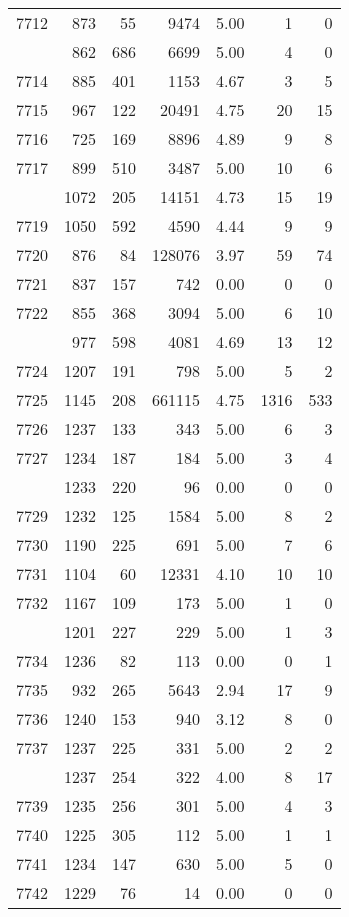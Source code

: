 \documentclass[
]{article}
\begin{document}
\begin{table}
\begin{tabular}[t]{lrrrrrr}
7712 & 873 & 55 & 9474 & 5.00 & 1 & 0\\
\addlinespace
7713 & 862 & 686 & 6699 & 5.00 & 4 & 0\\
7714 & 885 & 401 & 1153 & 4.67 & 3 & 5\\
7715 & 967 & 122 & 20491 & 4.75 & 20 & 15\\
7716 & 725 & 169 & 8896 & 4.89 & 9 & 8\\
7717 & 899 & 510 & 3487 & 5.00 & 10 & 6\\
\addlinespace
7718 & 1072 & 205 & 14151 & 4.73 & 15 & 19\\
7719 & 1050 & 592 & 4590 & 4.44 & 9 & 9\\
7720 & 876 & 84 & 128076 & 3.97 & 59 & 74\\
7721 & 837 & 157 & 742 & 0.00 & 0 & 0\\
7722 & 855 & 368 & 3094 & 5.00 & 6 & 10\\
\addlinespace
7723 & 977 & 598 & 4081 & 4.69 & 13 & 12\\
7724 & 1207 & 191 & 798 & 5.00 & 5 & 2\\
7725 & 1145 & 208 & 661115 & 4.75 & 1316 & 533\\
7726 & 1237 & 133 & 343 & 5.00 & 6 & 3\\
7727 & 1234 & 187 & 184 & 5.00 & 3 & 4\\
\addlinespace
7728 & 1233 & 220 & 96 & 0.00 & 0 & 0\\
7729 & 1232 & 125 & 1584 & 5.00 & 8 & 2\\
7730 & 1190 & 225 & 691 & 5.00 & 7 & 6\\
7731 & 1104 & 60 & 12331 & 4.10 & 10 & 10\\
7732 & 1167 & 109 & 173 & 5.00 & 1 & 0\\
\addlinespace
7733 & 1201 & 227 & 229 & 5.00 & 1 & 3\\
7734 & 1236 & 82 & 113 & 0.00 & 0 & 1\\
7735 & 932 & 265 & 5643 & 2.94 & 17 & 9\\
7736 & 1240 & 153 & 940 & 3.12 & 8 & 0\\
7737 & 1237 & 225 & 331 & 5.00 & 2 & 2\\
\addlinespace
7738 & 1237 & 254 & 322 & 4.00 & 8 & 17\\
7739 & 1235 & 256 & 301 & 5.00 & 4 & 3\\
7740 & 1225 & 305 & 112 & 5.00 & 1 & 1\\
7741 & 1234 & 147 & 630 & 5.00 & 5 & 0\\
7742 & 1229 & 76 & 14 & 0.00 & 0 & 0\\

\end{tabular}
\end{table}
\end{document}

